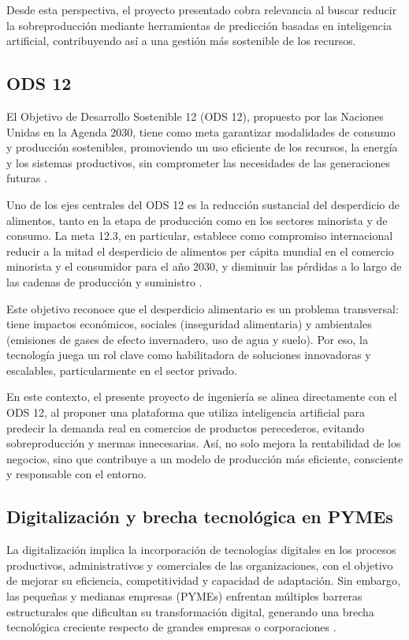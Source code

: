 Desde esta perspectiva, el proyecto presentado cobra relevancia al buscar reducir la sobreproducción mediante herramientas de predicción basadas en inteligencia artificial, contribuyendo así a una gestión más sostenible de los recursos.

\subsection{ODS 12}

El Objetivo de Desarrollo Sostenible 12 (ODS 12), propuesto por las Naciones Unidas en la Agenda 2030, tiene como meta garantizar modalidades de consumo y producción sostenibles, promoviendo un uso eficiente de los recursos, la energía y los sistemas productivos, sin comprometer las necesidades de las generaciones futuras \parencite{onu2015}.

Uno de los ejes centrales del ODS 12 es la reducción sustancial del desperdicio de alimentos, tanto en la etapa de producción como en los sectores minorista y de consumo. La meta 12.3, en particular, establece como compromiso internacional reducir a la mitad el desperdicio de alimentos per cápita mundial en el comercio minorista y el consumidor para el año 2030, y disminuir las pérdidas a lo largo de las cadenas de producción y suministro \parencite{unep2021}.

Este objetivo reconoce que el desperdicio alimentario es un problema transversal: tiene impactos económicos, sociales (inseguridad alimentaria) y ambientales (emisiones de gases de efecto invernadero, uso de agua y suelo). Por eso, la tecnología juega un rol clave como habilitadora de soluciones innovadoras y escalables, particularmente en el sector privado.

En este contexto, el presente proyecto de ingeniería se alinea directamente con el ODS 12, al proponer una plataforma que utiliza inteligencia artificial para predecir la demanda real en comercios de productos perecederos, evitando sobreproducción y mermas innecesarias. Así, no solo mejora la rentabilidad de los negocios, sino que contribuye a un modelo de producción más eficiente, consciente y responsable con el entorno.

\subsection{Digitalización y brecha tecnológica en PYMEs}

La digitalización implica la incorporación de tecnologías digitales en los procesos productivos, administrativos y comerciales de las organizaciones, con el objetivo de mejorar su eficiencia, competitividad y capacidad de adaptación. Sin embargo, las pequeñas y medianas empresas (PYMEs) enfrentan múltiples barreras estructurales que dificultan su transformación digital, generando una brecha tecnológica creciente respecto de grandes empresas o corporaciones \parencite{oecd2021}.

